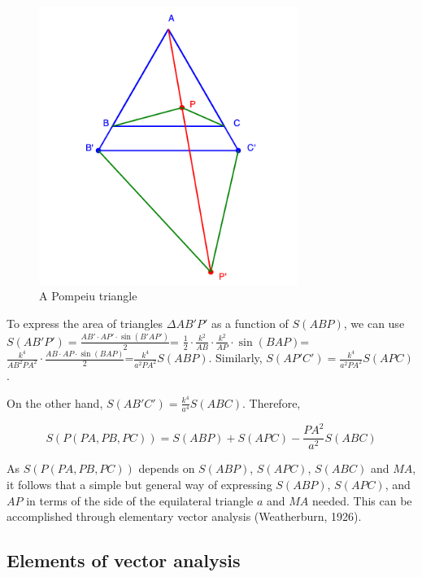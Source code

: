 \documentclass[12pt]{article}
\begin{document}
\begin{figure}[h]
\centering
\includegraphics[width=0.75\textwidth]{pompeiuTriangle.png}
\caption{A Pompeiu triangle}
\label{fig:pompeiuTriangles1}
\end{figure}

To express the area of triangles $\Delta AB'P'$ as a function of $S(ABP)$, we can use $S(AB'P')=\frac {AB'\cdot AP' \cdot \sin(B'AP')}{2}$=
$\frac{1}{2} \cdot \frac {k^2} {AB} \cdot \frac {k^2}{AP} \cdot \sin(BAP)$=$\frac {k^4} {AB^2 PA^2} \cdot \frac {AB \cdot AP \cdot \sin(BAP)} {2}$=$\frac {k^4}{a^2 PA^2} S(ABP)$. Similarly, $S(AP'C')=\frac {k^4}{a^2 PA^2} S(APC)$. 

On the other hand, $S(AB'C')=\frac {k^4}{a^4}S(ABC)$.  Therefore,

\begin{equation}
    S(P(PA,PB,PC))=S(ABP)+ S(APC)-\frac{PA^2}{a^2}S(ABC)
    \label{eq:area2}
\end{equation}

As $S(P(PA,PB,PC))$ depends on $S(ABP)$, $S(APC)$, $S(ABC)$ and $MA$, it follows that a simple but general way of expressing $S(ABP)$, $S(APC)$, and $AP$ in terms of the side of the equilateral triangle $a$ and $MA$ needed.  This can be accomplished through elementary vector analysis (Weatherburn, 1926).

\subsection{Elements of vector analysis}
\end{document}
